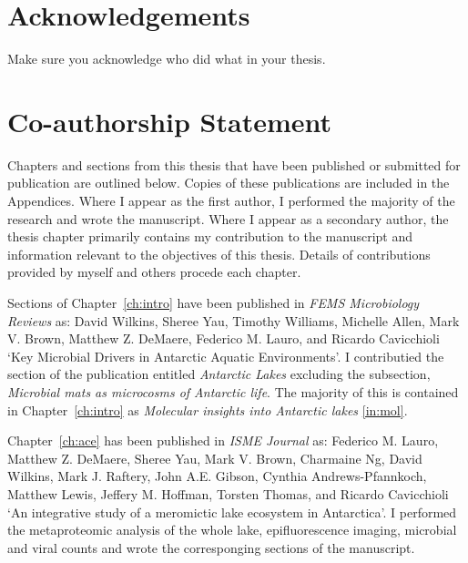 \documentclass[11pt,a4paper,twoside,openright]{report}
\begin{document}
\chapter*{Acknowledgements}
Make sure you acknowledge who did what in your thesis.

\chapter*{Co-authorship Statement}
Chapters and sections from this thesis that have been published or submitted for publication
 are outlined below.
Copies of these publications are included in the Appendices.
Where I appear as the first author, I performed the majority of the research and wrote the 
manuscript. 
Where I appear as a secondary author, the thesis chapter primarily contains my contribution to the 
manuscript and information relevant to the objectives of this thesis.
Details of contributions provided by myself and others procede each chapter.


Sections of Chapter~\ref{ch:intro} have been published in \textit{FEMS Microbiology Reviews} as: 
David Wilkins, Sheree Yau, Timothy Williams, Michelle Allen, Mark V. Brown, Matthew Z. DeMaere, 
Federico M. Lauro, and Ricardo Cavicchioli 
`Key Microbial Drivers in Antarctic Aquatic Environments'.
I contributied the section of the publication entitled \emph{Antarctic Lakes} 
excluding the subsection, 
\emph{Microbial mats as microcosms of Antarctic life}.
The majority of this is contained in Chapter~\ref{ch:intro} as 
\emph{Molecular insights into Antarctic lakes} \ref{in:mol}.

Chapter~\ref{ch:ace} has been published in 
\textit{ISME Journal} as:
Federico M. Lauro, Matthew Z. DeMaere, Sheree Yau, Mark V. Brown, Charmaine Ng, David Wilkins, 
Mark J. Raftery, John A.E. Gibson, Cynthia Andrews-Pfannkoch, Matthew Lewis, Jeffery M. Hoffman,
Torsten Thomas, and Ricardo Cavicchioli
`An integrative study of a meromictic lake ecosystem in Antarctica'.
I performed the metaproteomic analysis of the whole lake, epifluorescence imaging, 
microbial and viral counts and wrote the corresponging sections of the manuscript.
\end{document}
